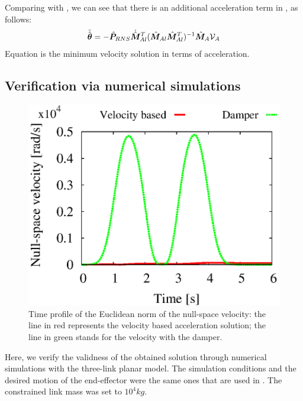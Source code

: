 Comparing  with ,
we can see that there is an additional acceleration term in , as follows:
%
\begin{align}
  {\ddot{\hat{\bm{\theta}}}} = -{\hat{\bm{P}}}_{RNS}\dot{{\hat{\bm{M}}}}_{Al}^{T}({\hat{\bm{M}}}_{Al}{\hat{\bm{M}}}_{Al}^{T})^{-1}{\hat{\bm{M}}}_{A}\mathcal{V}_{A}
\end{align}
%
Equation  is the minimum velocity solution in terms of acceleration.

\subsection{Verification via numerical simulations}
%
\begin{figure}[t]
  \centering
  \begin{minipage}{0.7\linewidth}
    \centering
    \includegraphics[width=1.0\linewidth]{fig/chapter7/stabilize/nullspace.eps}
  \end{minipage}
  \caption{Time profile of the Euclidean norm of the null-space velocity:
  the line in red represents the velocity based acceleration solution;
the line in green stands for the velocity with the damper.}
  \label{fig:RES_VEL}
\end{figure}
%
Here, we verify the validness of the obtained solution through numerical simulations with
the three-link planar model.
The simulation conditions and the desired motion of the end-effector were
the same ones that are used in .
The constrained link mass was set to $10^{4}\unit{kg}$.

